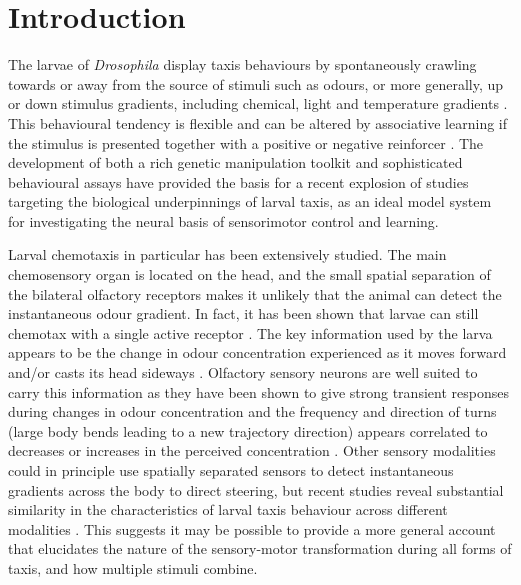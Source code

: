 \documentclass[11pt,a4paper]{article}
\newcommand{\Dros }{\emph{Drosophila }}
\newcommand{\todoBW}[1]{\todo[author=BW,color=orange, size=\tiny,inline]{#1}}
\begin{document}
\section{Introduction}
The larvae of \Dros display taxis behaviours by spontaneously crawling towards or away from the source of stimuli such as odours, or more generally, up or down stimulus gradients, including chemical, light and temperature gradients \citep{luo2010navigational,gomez2011active,gomez2012active,gomez2014multilevel,kane2013sensorimotor,klein2015sensory}. This behavioural tendency is flexible and can be altered by associative learning if the stimulus is presented together with a positive or negative reinforcer \citep{ache2005olfaction,scherer2003olfactory,gerber2004engram,diegelmann2013maggot,schleyer2015learning}. The development of both a rich genetic manipulation toolkit and sophisticated behavioural assays 
have provided the basis for a recent explosion of studies targeting the biological underpinnings of larval taxis, as an ideal model system for investigating the neural basis of sensorimotor control and learning.

Larval chemotaxis in particular has been extensively studied. The main chemosensory organ is located on the head, and the small spatial separation of the bilateral olfactory receptors makes it unlikely that the animal can detect the instantaneous odour gradient. In fact, it has been shown that larvae can still chemotax with a single active receptor  \citep{fishilevich2005chemotaxis,gomez2010mechanisms,louis2008bilateral}. The key information used by the larva  appears to be the change in odour concentration experienced as it moves forward and/or casts its head sideways \citep{gomez2010mechanisms}. 
Olfactory sensory neurons are well suited to carry this information as they have been shown to give strong transient responses during changes in odour concentration \citep{de2013common,nagel2011biophysical,kim2011system,schulze2015dynamical} and the frequency and direction of turns (large body bends leading to a new trajectory direction) appears correlated to  decreases or increases in the perceived concentration \citep{hernandez2015reverse,schulze2015dynamical}. 
  Other sensory modalities could in principle use spatially separated sensors to detect instantaneous gradients across the body to direct steering, but recent studies reveal substantial similarity in the characteristics of larval taxis behaviour across different modalities \citep{gepner2015computations, bellmann2010optogenetically, lahiri2011two}. This suggests it may be possible to provide a more general account that elucidates the nature of the sensory-motor transformation during all forms of taxis, and how multiple stimuli combine. 
\end{document}
